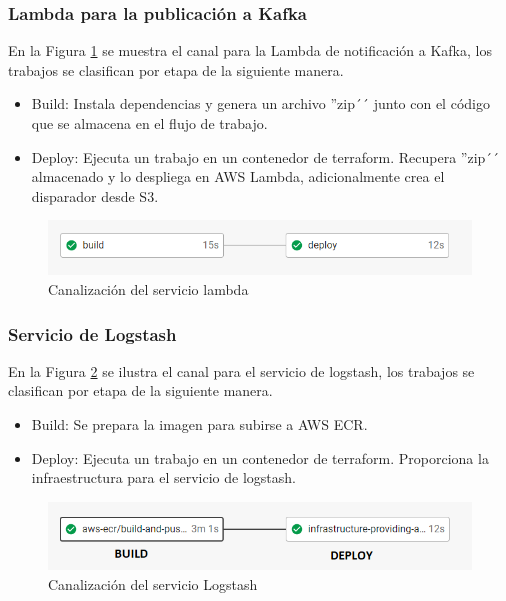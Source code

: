 \subsubsection {Lambda para la publicación a Kafka}


En la Figura \ref{pipelineLambdaProducer} se muestra el canal para la Lambda de notificación a Kafka, los trabajos se clasifican por etapa de la siguiente manera.

\begin {itemize}
\item Build: Instala dependencias y genera un archivo ''zip´´ junto con el código que se almacena en el flujo de trabajo.
\item Deploy: Ejecuta un trabajo en un contenedor de terraform. Recupera ''zip´´ almacenado y lo despliega en AWS Lambda, adicionalmente crea el disparador desde S3.
\end {itemize}

\begin{figure}[H]
	\centering
	\includegraphics[width=1\linewidth]{bibliografia/Imagenes/lambdaProducerPipeline.PNG}
	\caption {Canalización del servicio lambda}
	\label {pipelineLambdaProducer}
\end {figure}


\subsubsection {Servicio de Logstash}

En la Figura \ref{pipelineKafkaLogstash} se ilustra el canal para el servicio de logstash, los trabajos se clasifican por etapa de la siguiente manera.

\begin {itemize}
\item Build: Se prepara la imagen para subirse a AWS ECR.
\item Deploy: Ejecuta un trabajo en un contenedor de terraform. Proporciona la infraestructura para el servicio de logstash.
\end {itemize}

\begin{figure}[H]
	\centering
	\includegraphics[width=1\linewidth]{bibliografia/Imagenes/kafkaLogstashPipeline.png}
	\caption {Canalización del servicio Logstash}
	\label {pipelineKafkaLogstash}
	\end {figure}

